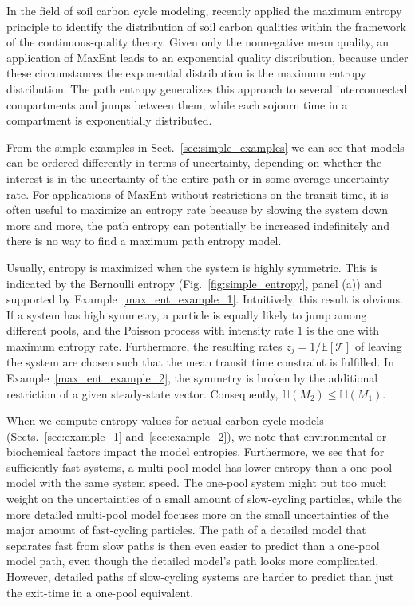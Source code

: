 \documentclass[smallextended]{svjour3}
\newcommand{\E}{\mathbb{E}}
\newcommand{\TT}{\mathcal{T}}
\renewcommand{\H}{\mathbb{H}}
\begin{document}
In the field of soil carbon cycle modeling, \citet{Agren2021BGC} recently applied the maximum entropy principle to identify the distribution of soil carbon qualities within the framework of the continuous-quality theory.
Given only the nonnegative mean quality, an application of MaxEnt leads to an exponential quality distribution, because under these circumstances the exponential distribution is the maximum entropy distribution.
The path entropy generalizes this approach to several interconnected compartments and jumps between them, while each sojourn time in a compartment is exponentially distributed.

From the simple examples in Sect.~\ref{sec:simple_examples} we can see that models can be ordered differently in terms of uncertainty, depending on whether the interest is in the uncertainty of the entire path or in some average uncertainty rate.
For applications of MaxEnt without restrictions on the transit time, it is often useful to maximize an entropy rate because by slowing the system down more and more, the path entropy can potentially be increased indefinitely and there is no way to find a maximum path entropy model.

Usually, entropy is maximized when the system is highly symmetric.
This is indicated by the Bernoulli entropy (Fig.~\ref{fig:simple_entropy}, panel (a)) and supported by Example~\ref{max_ent_example_1}.
Intuitively, this result is obvious.
If a system has high symmetry, a particle is equally likely to jump among different pools, and the Poisson process with intensity rate $1$ is the one with maximum entropy rate.
Furthermore, the resulting rates $z_j = 1/\E\left[\TT\right]$ of leaving the system are chosen such that the mean transit time constraint is fulfilled. 
In Example~\ref{max_ent_example_2}, the symmetry is broken by the additional restriction of a given steady-state vector.
Consequently, $\H(M_2) \leq \H(M_1)$.

When we compute entropy values for actual carbon-cycle models (Sects.~\ref{sec:example_1} and~\ref{sec:example_2}), we note that environmental or biochemical factors impact the model entropies.
Furthermore, we see that for sufficiently fast systems, a multi-pool model has lower entropy than a one-pool model with the same system speed.
The one-pool system might put too much weight on the uncertainties of a small amount of slow-cycling particles, while the more detailed multi-pool model focuses more on the small uncertainties of the major amount of fast-cycling particles.
The path of a detailed model that separates fast from slow paths is then even easier to predict than a one-pool model path, even though the detailed model's path looks more complicated.
However, detailed paths of slow-cycling systems are harder to predict than just the exit-time in a one-pool equivalent.
\end{document}
